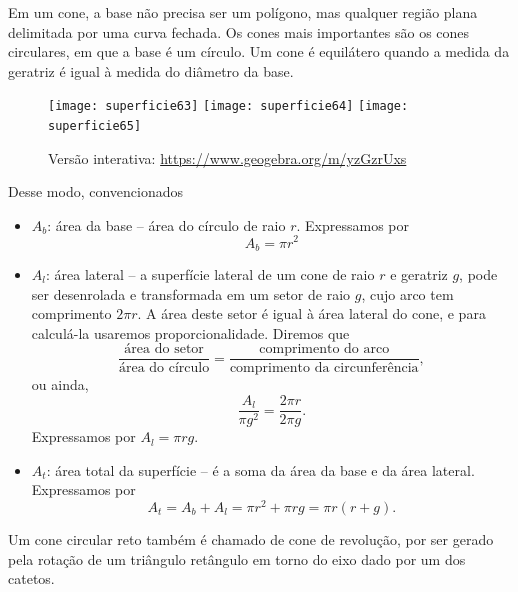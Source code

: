 Em um cone, a base não precisa ser um polígono, mas qualquer região plana delimitada por uma curva fechada. Os cones mais importantes são os cones circulares, em que a base é um círculo. Um cone é equilátero quando a medida da geratriz é igual à medida do diâmetro da base.

\begin{figure}[H]
\centering

{\texttt{[image: superficie63]}\hspace{.5em}
\texttt{[image: superficie64]}\hspace{.5em}
\texttt{[image: superficie65]}}

\caption{Versão interativa: \url{https://www.geogebra.org/m/yzGzrUxs}}
\end{figure}

Desse modo, convencionados

\begin{itemize}
  \item $A_b$: área da base -- área do círculo de raio $r$. Expressamos por
  \begin{equation*}
  A_b=\pi r^2
  \end{equation*}  
  \item $A_l$: área lateral -- a superfície lateral de um cone de raio $r$ e geratriz $g$, pode ser desenrolada e transformada em um setor de raio $g$, cujo arco tem comprimento $2\pi r$. A área deste setor é igual à área lateral do cone, e para calculá-la usaremos proporcionalidade. Diremos que
  \begin{equation*}
  \frac{\text{área do setor}}{\text{área do círculo}}=\frac{\text{comprimento do arco}}{\text{comprimento da circunferência}},
  \end{equation*}
  ou ainda,
  \begin{equation*}
  \frac{A_l}{\pi g^2}=\frac{2\pi r}{2\pi g}.
  \end{equation*}
  Expressamos por $A_l=\pi rg$.
  \item $A_t$: área total da superfície -- é a soma da área da base e da área lateral. Expressamos por
  \begin{equation*}
  A_t=A_b+A_l=\pi r^2+\pi rg=\pi r(r+g).  
  \end{equation*}
\end{itemize}

Um cone circular reto também é chamado de cone de revolução, por ser gerado pela rotação de um triângulo retângulo em torno do eixo dado por um dos catetos.

